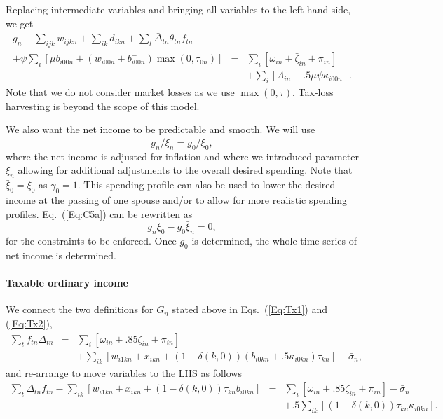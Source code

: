\documentclass{article}[fleqn,12pt]
\begin{document}
	Replacing intermediate variables and bringing all variables to the left-hand side, we get
	\begin{eqnarray}
		\label{Eq:C4}
		g_n - \sum_{ijk} w_{ijkn} + \sum_{ik}d_{ikn}
		+ \sum_t \bar{\Delta}_{t n}\theta_{t n} f_{t n}&&\nonumber \\
		+ \psi \sum_{i} \left[\mu b_{i00n} + (w_{i00n} + b^-_{i00n})
		\max(0, \tau_{0n})\right] 
		&= & \sum_i [\omega_{in} + \bar{\zeta}_{in} + \pi_{in} ] \nonumber\\
		&& + \sum_i [\Lambda_{in} - .5\mu\psi\kappa_{i00n}].
	\end{eqnarray}
	Note that we do not consider market losses as we use $\max(0, \tau)$. Tax-loss
	harvesting is beyond the scope of this model.

	We also want the net income to be predictable and smooth. We will use
\begin{equation}
	\label{Eq:C5a}
	g_{n}/\bar{\xi}_{n} = g_0/\bar{\xi}_0,
\end{equation}
where the net income is adjusted for inflation and where we introduced parameter $\xi_n$ 
allowing for additional adjustments to the overall desired spending.
Note that $\bar{\xi}_0 = \xi_0$ as $\gamma_0=1$.
This spending profile can also be used to lower the desired income at the passing
of one spouse and/or to allow for more realistic spending profiles.
Eq.~(\ref{Eq:C5a}) can be rewritten as
\begin{equation}
	\label{Eq:C5}
	g_n \xi_0 - g_0 \bar{\xi}_n = 0,
\end{equation}
for the constraints to be enforced. Once $g_0$ is determined, the whole time series of net income
is determined.

\paragraph*{Taxable ordinary income}
	We connect the two definitions for $G_n$ stated above in Eqs.~(\ref{Eq:Tx1}) and (\ref{Eq:Tx2}),
	\begin{eqnarray}
		\sum_t f_{t n}\bar{\Delta}_{t n} &=&
		\sum_i [\omega_{in} + .85\bar\zeta_{in} + \pi_{in}]  \nonumber \\
		&& + \sum_{ik} [w_{i1kn} + x_{ikn} + (1 - \delta(k, 0))(b_{i0kn} +
		.5\kappa_{i0kn})\tau_{kn}] - \bar{\sigma}_n,
	\end{eqnarray}
	and re-arrange to move variables to the LHS as follows
	\begin{eqnarray}
		\label{Eq:C6}
		\sum_t \bar{\Delta}_{t n} f_{t n}
		- \sum_{ik} [
			w_{i1kn} + x_{ikn} +
			(1 - \delta(k, 0))\tau_{kn}b_{i0kn}] &=&
		\sum_i [\omega_{in} + .85\bar\zeta_{in} + \pi_{in} ] 
		- \bar{\sigma}_n
		\nonumber \\
		&& + .5\sum_{ik} [(1-\delta(k, 0))\tau_{kn}\kappa_{i0kn}].
	\end{eqnarray}
\end{document}
